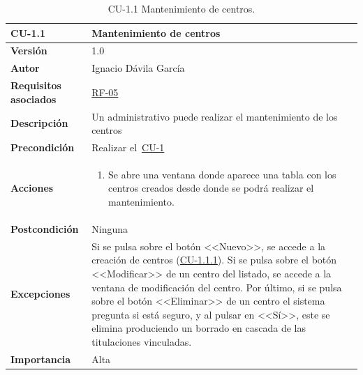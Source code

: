 \begin{table}[p]
\label{table:CU-1.1}
	\centering
	\begin{tabularx}{\linewidth}{ p{} p{} }
		\toprule
		\textbf{CU-1.1}    & \textbf{Mantenimiento de centros}\\
		\toprule
		\textbf{Versión}              & 1.0    \\
		\textbf{Autor}                & Ignacio Dávila García \\
		\textbf{Requisitos asociados} & \hyperref[itm:RF5]{RF-05} \\
		\textbf{Descripción}          & Un administrativo puede realizar el mantenimiento de los centros \\
		\textbf{Precondición}         & Realizar el~\hyperref[table:CU-1]{CU-1} \\
		\textbf{Acciones}             &
		\begin{enumerate}
			\def\labelenumi{\arabic{enumi}.}
			\tightlist
			\item Se abre una ventana donde aparece una tabla con los centros creados desde donde se podrá realizar el mantenimiento.
		\end{enumerate}\\
		\textbf{Postcondición}        & Ninguna \\
		\textbf{Excepciones}          & Si se pulsa sobre el botón <<Nuevo>>, se accede a la creación de centros (\hyperref[table:CU-1.1.1]{CU-1.1.1}). Si se pulsa sobre el botón <<Modificar>> de un centro del listado, se accede a la ventana de modificación del centro. Por último, si se pulsa sobre el botón <<Eliminar>> de un centro el sistema pregunta si está seguro, y al pulsar en <<Sí>>, este se elimina produciendo un borrado en cascada de las titulaciones vinculadas. \\
		\textbf{Importancia}          & Alta \\
		\bottomrule
	\end{tabularx}
	\caption{CU-1.1 Mantenimiento de centros.}
\end{table}
\FloatBarrier

